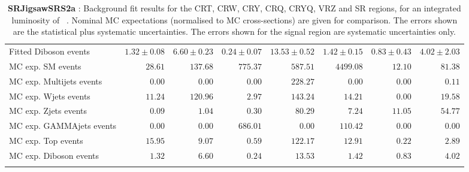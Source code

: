 \begin{table}
\begin{center}
{\begin{tabular*}{\textwidth}{@{\extracolsep{\fill}}lrrrrrrr}
        Fitted Diboson events         & $1.32 \pm 0.08$          & $6.60 \pm 0.23$          & $0.24 \pm 0.07$          & $13.53 \pm 0.52$          & $1.42 \pm 0.15$          & $0.83 \pm 0.43$          & $4.02 \pm 2.03$              \\
 \noalign{\smallskip}\hline\noalign{\smallskip}
MC exp. SM events              & $28.61$          & $137.68$          & $775.37$          & $587.51$          & $4499.08$          & $12.10$          & $81.38$              \\
\noalign{\smallskip}\hline\noalign{\smallskip}
        MC exp. Multijets events         & $0.00$          & $0.00$          & $0.00$          & $228.27$          & $0.00$          & $0.00$          & $0.11$              \\
        MC exp. Wjets events         & $11.24$          & $120.96$          & $2.97$          & $143.24$          & $14.21$          & $0.00$          & $19.58$              \\
        MC exp. Zjets events         & $0.09$          & $1.04$          & $0.30$          & $80.29$          & $7.24$          & $11.05$          & $54.77$              \\
        MC exp. GAMMAjets events         & $0.00$          & $0.00$          & $686.01$          & $0.00$          & $110.42$          & $0.00$          & $0.00$              \\
        MC exp. Top events         & $15.95$          & $9.07$          & $0.59$          & $122.17$          & $12.91$          & $0.22$          & $2.89$              \\
        MC exp. Diboson events         & $1.32$          & $6.60$          & $0.24$          & $13.53$          & $1.42$          & $0.83$          & $4.02$              \\
\noalign{\smallskip}\hline\noalign{\smallskip}
\end{tabular*}
}
\end{center}
\caption{{\bf SRJigsawSRS2a} : Background fit results for the CRT, CRW, CRY, CRQ, CRYQ, VRZ and SR regions, for an integrated luminosity of \ourintlumi~\ifb. Nominal MC expectations (normalised to MC cross-sections) are given for comparison. The errors shown are the statistical plus systematic uncertainties. The errors shown for the signal region are systematic uncertainties only.}
\label{table.results.systematics.in.logL.fit.CRT.CRW.CRY.CRQ.CRYQ.VRZ.SR.SRJigsawSRS2a}
\end{table}
%